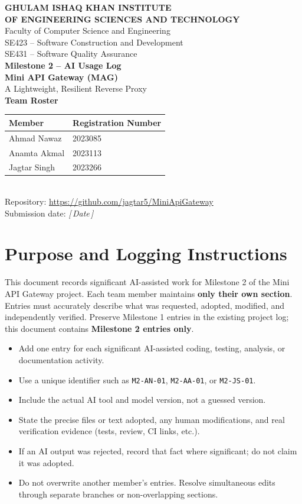 \documentclass[11pt,a4paper]{article}
\newcommand{\ma}{Ahmad Nawaz}
\newcommand{\mb}{Anamta Akmal}
\newcommand{\mc}{Jagtar Singh}
\newcommand{\placeholder}[1]{\textit{[\,#1\,]}}
\begin{document}
\begin{titlepage}
\centering
{\large\bfseries GHULAM ISHAQ KHAN INSTITUTE\\OF ENGINEERING SCIENCES AND TECHNOLOGY}\\[0.3cm]
Faculty of Computer Science and Engineering\\[0.9cm]
SE423 -- Software Construction and Development\\
SE431 -- Software Quality Assurance\\[0.6cm]
{\LARGE\bfseries Milestone 2 -- AI Usage Log}\\[0.5cm]
{\Large\bfseries Mini API Gateway (MAG)}\\[0.2cm]
A Lightweight, Resilient Reverse Proxy\\[1cm]
{\bfseries Team Roster}\\[0.3cm]
\begin{tabular}{ll}
\toprule
\textbf{Member} & \textbf{Registration Number}\\
\midrule
\ma & 2023085\\
\mb & 2023113\\
\mc & 2023266\\
\bottomrule
\end{tabular}\\[0.8cm]
Repository: \url{https://github.com/jagtar5/MiniApiGateway}\\[0.4cm]
Submission date: \placeholder{Date}
\end{titlepage}

\section{Purpose and Logging Instructions}
This document records significant AI-assisted work for Milestone 2 of the Mini API Gateway project. Each team member maintains \textbf{only their own section}. Entries must accurately describe what was requested, adopted, modified, and independently verified. Preserve Milestone 1 entries in the existing project log; this document contains \textbf{Milestone 2 entries only}.

\begin{itemize}[leftmargin=*]
\item Add one entry for each significant AI-assisted coding, testing, analysis, or documentation activity.
\item Use a unique identifier such as \texttt{M2-AN-01}, \texttt{M2-AA-01}, or \texttt{M2-JS-01}.
\item Include the actual AI tool and model version, not a guessed version.
\item State the precise files or text adopted, any human modifications, and real verification evidence (tests, review, CI links, etc.).
\item If an AI output was rejected, record that fact where significant; do not claim it was adopted.
\item Do not overwrite another member's entries. Resolve simultaneous edits through separate branches or non-overlapping sections.
\end{itemize}
\end{document}
